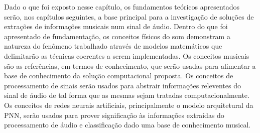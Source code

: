 Dado o que foi exposto nesse capítulo, os fundamentos teóricos apresentados serão, nos capítulos seguintes, a base principal para a investigação de soluções de extrações de informações musicais num sinal de áudio. Dentro do que foi apresentado de fundamentação, os conceitos físicos do som demonstram a natureza do fenômeno trabalhado através de modelos matemáticos que delimitarão as técnicas coerentes a serem implementadas. Os conceitos musicais são as referências, em termos de conhecimento, que serão usadas para alimentar a base de conhecimento da solução computacional proposta. Os conceitos de processamento de sinais serão usados para abstrair informações releventes do sinal de áudio de tal forma que as mesmas sejam tratadas computacionalmente. Os conceitos de redes neurais artificiais, principalmente o modelo arquitetural da PNN, serão usados para prover significação às informações extraídas do processamento de áudio e classificação dado uma base de conhecimento musical.

